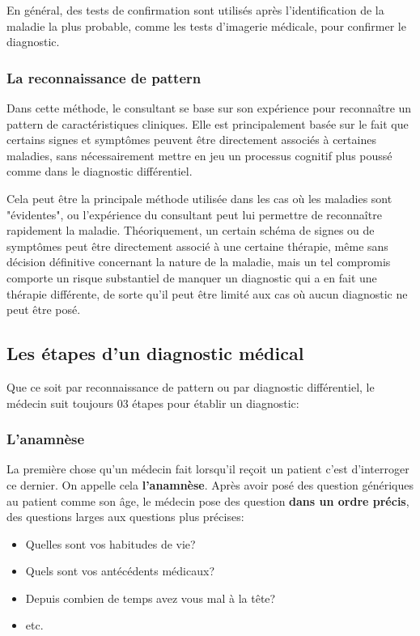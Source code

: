 En général, des tests de confirmation sont utilisés après l'identification de la maladie la plus probable, comme les tests d'imagerie médicale, pour confirmer le diagnostic.

\subsubsection{La reconnaissance de pattern}

Dans cette méthode, le consultant se base sur son expérience pour reconnaître un pattern de caractéristiques cliniques. Elle est principalement basée sur le fait que certains signes et symptômes peuvent être directement associés à certaines maladies, sans nécessairement mettre en jeu un processus cognitif plus poussé comme dans le diagnostic différentiel.

Cela peut être la principale méthode utilisée dans les cas où les maladies sont "évidentes", ou l'expérience du consultant peut lui permettre de reconnaître rapidement la maladie. Théoriquement, un certain schéma de signes ou de symptômes peut être directement associé à une certaine thérapie, même sans décision définitive concernant la nature de la maladie, mais un tel compromis comporte un risque substantiel de manquer un diagnostic qui a en fait une thérapie différente, de sorte qu'il peut être limité aux cas où aucun diagnostic ne peut être posé.


\subsection{Les étapes d'un diagnostic médical}

Que ce soit par reconnaissance de pattern ou par diagnostic différentiel, le médecin suit toujours 03 étapes pour établir un diagnostic:

\subsubsection{L'anamnèse}
La première chose qu'un médecin fait lorsqu'il reçoit un patient c'est d'interroger ce dernier. On appelle cela \textbf{l'anamnèse}. Après avoir posé des question génériques au patient comme son âge, le médecin pose des question \textbf{dans un ordre précis}, des questions larges aux questions plus précises:

\begin{itemize}
    \item Quelles sont vos habitudes de vie?
    \item Quels sont vos antécédents médicaux?
    \item Depuis combien de temps avez vous mal à la tête?
    \item etc.
\end{itemize}


